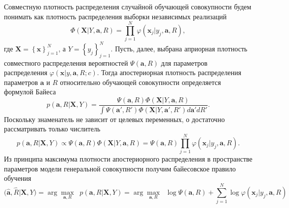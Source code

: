 Совместную плотность распределения случайной обучающей совокупности будем понимать как плотность 
распределения выборки независимых реализаций
$$\Phi(\mathbf{X}|Y,\mathbf{a},R)=\prod \limits_{j=1}^N \varphi(\mathbf{x}_j|y_j,\mathbf{a},R),$$ 
где $\mathbf{X}= \left\{\mathbf{x}\right\}_{j=1}^N$, а $Y = \left\{y_j\right\}_{j=1}^N$.
Пусть, далее, выбрана априорная плотность совместного распределения вероятностей $\Psi(\mathbf{a},R)$ 
для параметров распределения $\varphi \left( {\mathbf x | y,\mathbf{a},R;c} \right)$. Тогда апостериорная
 плотность распределения параметров $\mathbf{a}$ и $R$ относительно обучающей совокупности определяется 
формулой Байеса
$$p(\mathbf{a},R|\mathbf{X},Y)=\frac{\Psi(\mathbf{a},R) \Phi(\mathbf{X}|Y,\mathbf{a},R)}
{\int {\Psi(\mathbf{a}',R') \Phi(\mathbf{X}|Y,\mathbf{a}',R')d\mathbf{a}'dR'}}.$$
Поскольку знаменатель не зависит от целевых переменных, о достаточно рассматривать только числитель
$$p(\mathbf{a},R|\mathbf{X},Y) \propto \Psi(\mathbf{a},R) \Phi(\mathbf{X}|Y,\mathbf{a},R) = 
\Psi(\mathbf{a},R) \prod \limits_{j=1}^N \varphi(\mathbf{x}_j|y_j,\mathbf{a},R).$$
Из принципа максимума плотности апостериорного распределения в пространстве параметров модели генеральной
 совокупности получим байесовское правило обучения
$$\bigl(\hat{\mathbf{a}},\hat{R}|\mathbf{X},Y\bigr) = \arg\underset{\mathbf{a},R}{\max}\;\; p(\mathbf{a},R|\mathbf{X},Y) =
\arg\underset{\mathbf{a},R}{\max}\;\; {\log}\Psi(\mathbf{a},R) + \sum\limits_{j=1}^N{\log}\varphi(\mathbf{x}_j|y_j,\mathbf{a},R) $$


